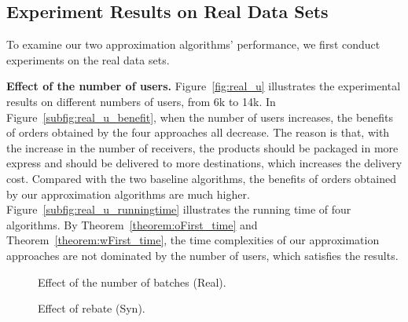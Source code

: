 \vspace{-1ex}
\subsection{Experiment Results on Real Data Sets}\vspace{-0.5ex}
To examine our two approximation algorithms' performance, we first conduct experiments on the real data sets.



\textbf{Effect of the number of users.} Figure~\ref{fig:real_u} illustrates the experimental results on different numbers of users, from 6k to 14k. In Figure~\ref{subfig:real_u_benefit}, when the number of users increases, the benefits of orders obtained by the four approaches all decrease. The reason is that, with the increase in the number of receivers, the products should be packaged in more express and should be delivered to more destinations, which increases the delivery cost. Compared with the two baseline algorithms, the benefits of orders obtained by our approximation algorithms are much higher. Figure~\ref{subfig:real_u_runningtime} illustrates the running time of four algorithms. By Theorem~\ref{theorem:oFirst_time} and Theorem~\ref{theorem:wFirst_time}, the time complexities of our approximation approaches are not dominated by the number of users, which satisfies the results. 

\begin{figure}[t!]\centering\vspace{-2ex}
	\subfigcapskip=-5pt
	\vspace{-2ex}
	\addtocounter{subfigure}{-1}
	\figureCaptionMargin
	\vspace{1ex}
	\caption{\small Effect of the number of batches (Real).}%
	\label{fig:real_b}
\end{figure}
\begin{figure}[t!]\centering
	\subfigcapskip=-5pt
	\vspace{-2ex}
	\addtocounter{subfigure}{-1}
	\figureCaptionMargin
	\vspace{1ex}
	\caption{\small Effect of rebate (Syn).}\figureBelowMargin
	\label{fig:syn_rebate}\vspace{-1ex}
\end{figure}

